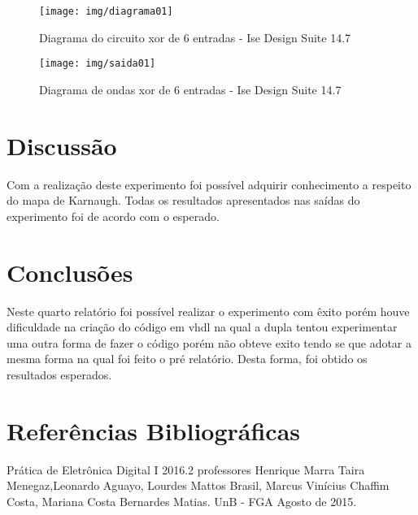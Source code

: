 \documentclass[12pts]{article}
\begin{document}
\begin{figure}[!htb]
  \centering
  \texttt{[image: img/diagrama01]}
  \caption{Diagrama do circuito xor de 6 entradas - Ise Design Suite 14.7}	
  \label{figRotulo}
\end{figure}

\begin{figure}[!htb]
  \centering

  \texttt{[image: img/saida01]}
  \caption{Diagrama de ondas xor de 6 entradas - Ise Design Suite 14.7}
  \label{figRotulo}
\end{figure}
\newpage

\section{Discussão}
\iffalse
Discussão sobre os resultados encontrados, comentando detalhadamente as medições realizadas e dando a devida interpretação destas, informando se os objetivos da experimento foram alcançados. Esta é uma das partes mais importantes do relatório: aqui, há oportunidade para expressar os conhecimentos adquiridos na prática e fazer a interrelação com os fundamentos teóricos.
\fi

Com a realização deste experimento foi possível adquirir conhecimento a respeito do mapa de Karnaugh. Todas os resultados apresentados nas saídas do experimento foi de acordo com o esperado.

\section{Conclusões}
\iffalse
Conclusões, mostrando os êxitos e eventuais problemas encontrados na realização do experimento, indicando as limitações, apresentando recomendações e/ou sugestões.
\fi

Neste quarto relatório foi possível realizar o experimento com êxito porém houve dificuldade na criação do código em vhdl na qual a dupla tentou experimentar uma outra forma de fazer o código porém não obteve exito tendo se que adotar a mesma forma na qual foi feito o pré relatório. Desta forma, foi obtido os resultados esperados.



\section{Referências Bibliográficas}
\iffalse
Referencias Bibliográficas, relacionadas e citadas de acordo com as normas da ABNT.
\fi
Prática de Eletrônica Digital I 2016.2 professores Henrique Marra Taira Menegaz,Leonardo Aguayo, Lourdes Mattos Brasil, Marcus Vinícius Chaffim Costa, Mariana Costa Bernardes Matias. UnB - FGA Agosto de 2015.

\iffalse
\section{Diagramas Esquemáticos}
Diagramas Esquemáticos. Todos os diagramas devem ser inseridos ao final do relatório em páginas separadas do texto, indicando a identificação do circuito, autor, revisor, versão e datas relevantes.
\fi
\newpage
\end{document}
